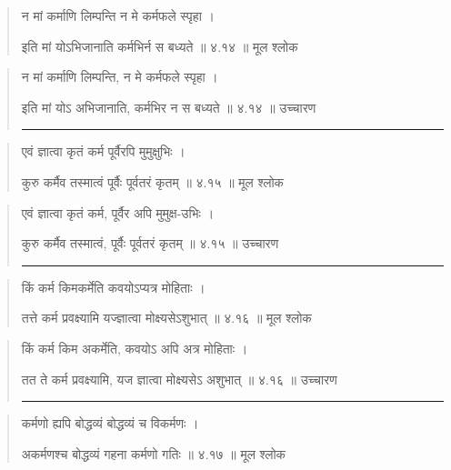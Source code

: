 \begin{quotation}

न मां कर्माणि लिम्पन्ति न मे कर्मफले स्पृहा  ।  

इति मां योऽभिजानाति कर्मभिर्न स बध्यते  ॥ ४.१४ ॥  मूल श्लोक
\end{quotation}

\begin{quotation}

न मां कर्माणि लिम्पन्ति, न मे कर्मफले स्पृहा  ।  

इति मां योऽ अभिजानाति, कर्मभिर न स बध्यते  ॥ ४.१४ ॥  उच्चारण

\noindent\rule{16cm}{0.4pt} 
\end{quotation}


\begin{quotation}

एवं ज्ञात्वा कृतं कर्म पूर्वैरपि मुमुक्षुभिः  ।  

कुरु कर्मैव तस्मात्वं पूर्वैः पूर्वतरं कृतम्‌  ॥ ४.१५ ॥  मूल श्लोक
\end{quotation}

\begin{quotation}

एवं ज्ञात्वा कृतं कर्म, पूर्वैर अपि मुमुक्ष-उभिः  ।  

कुरु कर्मैव तस्मात्वं, पूर्वैः पूर्वतरं कृतम्‌  ॥ ४.१५ ॥  उच्चारण

\noindent\rule{16cm}{0.4pt} 
\end{quotation}


\begin{quotation}

किं कर्म किमकर्मेति कवयोऽप्यत्र मोहिताः  ।  

तत्ते कर्म प्रवक्ष्यामि यज्ज्ञात्वा मोक्ष्यसेऽशुभात्‌  ॥ ४.१६ ॥  मूल श्लोक
\end{quotation}

\begin{quotation}
किं कर्म किम अकर्मेति, कवयोऽ अपि अत्र मोहिताः  ।  

तत ते कर्म प्रवक्ष्यामि, यज ज्ञात्वा मोक्ष्यसेऽ अशुभात्‌  ॥ ४.१६ ॥  उच्चारण

\noindent\rule{16cm}{0.4pt} 
\end{quotation}


\begin{quotation}

कर्मणो ह्यपि बोद्धव्यं बोद्धव्यं च विकर्मणः  ।  

अकर्मणश्च बोद्धव्यं गहना कर्मणो गतिः  ॥ ४.१७ ॥  मूल श्लोक
\end{quotation}

